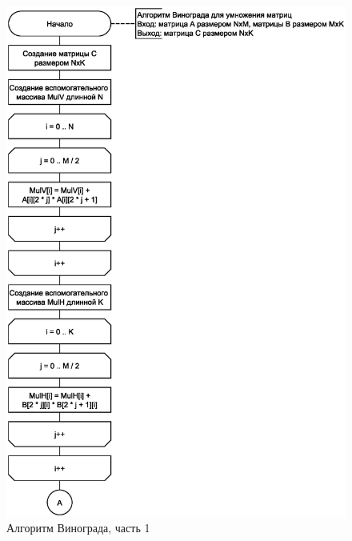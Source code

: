 \begin{figure}[h]
	\centering
	\includegraphics[scale=0.75]{img/vinograd_1.eps}
	\caption{Алгоритм Винограда, часть 1}
	\label{fig:vin1}
\end{figure}

\clearpage


